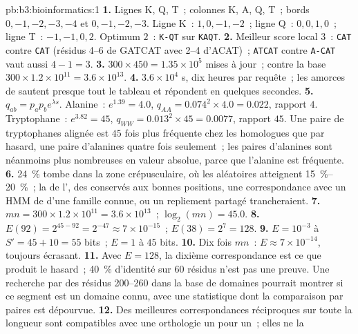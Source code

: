 \begin{solution}{pb:b3:bioinformatics:1}
\textbf{1.} Lignes K, Q, T~; colonnes K, A, Q, T~; bords
$0,-1,-2,-3,-4$ et $0,-1,-2,-3$. Ligne K~: $1, 0, -1, -2$~; ligne Q~:
$0, 0, 1, 0$~; ligne T~: $-1, -1, 0, 2$. Optimum $2$~:
\texttt{K-QT} sur \texttt{KAQT}.
\textbf{2.} Meilleur score local $3$~: \texttt{CAT} contre \texttt{CAT}
(résidus 4--6 de GATCAT avec 2--4 d'ACAT)~; \texttt{ATCAT} contre
\texttt{A-CAT} vaut aussi $4 - 1 = 3$.
\textbf{3.} $300\times 450 = 1.35\times 10^{5}$ mises à jour~; contre
la base $300\times 1.2\times 10^{11} = 3.6\times 10^{13}$.
\textbf{4.} $3.6\times 10^{4}$ s, dix heures par requête~; les amorces
de  sautent presque tout le tableau et répondent en quelques
secondes.
\textbf{5.} $q_{ab} = p_{a}p_{b}e^{\lambda s}$. Alanine~: $e^{1.39} = 4.0$,
$q_{AA} = 0.074^{2}\times 4.0 = 0.022$, rapport $4$. Tryptophane~:
$e^{3.82} = 45$, $q_{WW} = 0.013^{2}\times 45 = 0.0077$, rapport $45$.
Une paire de tryptophanes alignée est $45$ fois plus fréquente chez les
homologues que par hasard, une paire d'alanines quatre fois seulement~;
les paires d'alanines sont néanmoins plus nombreuses en valeur absolue,
parce que l'alanine est fréquente.
\textbf{6.} \qty{24}{\%} tombe dans la zone crépusculaire, où les
 aléatoires atteignent \qtyrange{15}{20}{\%}~; la 
de l', des  conservés aux bonnes positions, une
correspondance avec un HMM de  d'une famille connue, ou un
repliement partagé trancheraient.
\textbf{7.} $mn = 300\times 1.2\times 10^{11} = 3.6\times 10^{13}$~;
$\log_{2}(mn) = 45.0$.
\textbf{8.} $E(92) = 2^{45 - 92} = 2^{-47} \approx 7\times 10^{-15}$~;
$E(38) = 2^{7} = 128$.
\textbf{9.} $E = 10^{-3}$ à $S' = 45 + 10 = 55$ bits~; $E = 1$ à $45$
bits.
\textbf{10.} Dix fois $mn$~: $E \approx 7\times 10^{-14}$, toujours
écrasant.
\textbf{11.} Avec $E = 128$, la dixième correspondance est ce que
produit le hasard~; \qty{40}{\%} d'identité sur $60$ résidus n'est pas
une preuve. Une recherche par  des résidus 200--260 dans la base
de domaines pourrait montrer si ce segment est un domaine connu, avec
une statistique dont la comparaison par paires est dépourvue.
\textbf{12.} Des meilleures correspondances réciproques sur toute la
longueur sont compatibles avec une orthologie un pour un~; elles ne la

\end{solution}
